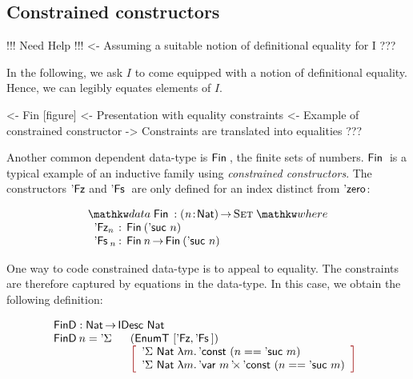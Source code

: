 \subsection{Constrained constructors}

\begin{wstructure}
!!! Need Help !!!
<- Assuming a suitable notion of definitional equality for I
    ???
\end{wstructure}

In the following, we ask $I$ to come equipped with a notion of
definitional equality. Hence, we can legibly equates elements of $I$.


\begin{wstructure}
<- Fin [figure]
    <- Presentation with equality constraints
    <- Example of constrained constructor
        -> Constraints are translated into equalities
    ???
\end{wstructure}
 
Another common dependent data-type is $\Fin$, the finite sets of
numbers. $\Fin$ is a typical example of an inductive family using
\emph{constrained constructors}. The constructors $\FinZero$ and
$\FinSuc$ are only defined for an index distinct from $\NatZero$:


\[
\stk{
\data \Fin{} : \PI{\V{n}}{\Nat} \Set \where \\
\;\;\begin{array}{@{}l@{\::\:\:}l@{\quad}l}
    \FinZero_n      & \Fin{(\NatSuc{n})}   \\
    \FinSuc{}_n     & \Fin{n} \To \Fin{(\NatSuc{n})}
\end{array}
}
\]

One way to code constrained data-type is to appeal to equality. The
constraints are therefore captured by equations in the data-type. In
this case, we obtain the following definition:

\[\stk{
\FinD : \Nat \To \IDesc{\Nat} \\
\begin{array}{@{}ll}
\FinD\: n = \DSigma{}{} & (\EnumT{[ \FinZero , \FinSuc{} ]}) \\
                        & \bigRedBracket{
                          \begin{array}{l}
                            \DSigma{\Nat}{\LAM{m} \DConst{(n \PropEq \NatSuc{m})}} \\
                            \DSigma{\Nat}{\LAM{m} \DProd{\DVar{m}}{\DConst{(n \PropEq \NatSuc{m})}}}
                          \end{array}
                          }
\end{array}
}\]

